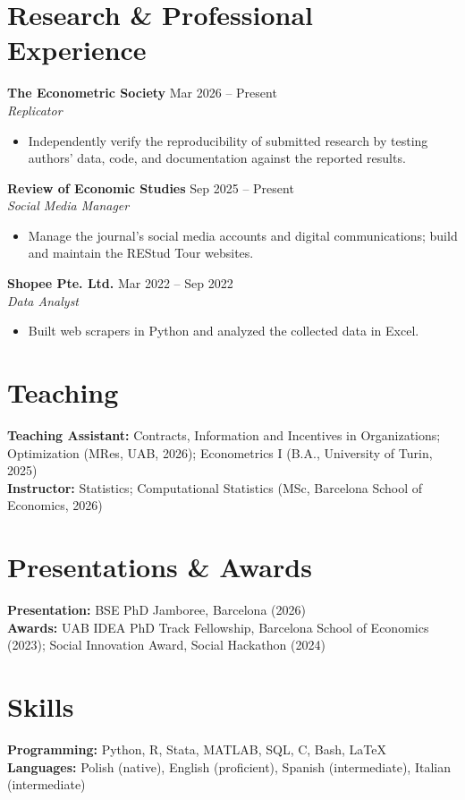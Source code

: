 \documentclass[11pt,a4paper]{article}
\newcommand{\role}[4]{%
    \textbf{#1} \hfill #2\\
    \textit{#3} \hfill \textit{#4}\par
}
\begin{document}
\section*{Research \& Professional Experience}

\role{The Econometric Society}{Mar 2026 -- Present}{Replicator}{}
\begin{itemize}
    \item Independently verify the reproducibility of submitted research by testing authors' data, code, and documentation against the reported results.
\end{itemize}
\vspace{0.3em}
\role{Review of Economic Studies}{Sep 2025 -- Present}{Social Media Manager}{}
\begin{itemize}
    \item Manage the journal's social media accounts and digital communications; build and maintain the REStud Tour websites.
\end{itemize}
\vspace{0.3em}
\role{Shopee Pte. Ltd.}{Mar 2022 -- Sep 2022}{Data Analyst}{}
\begin{itemize}
    \item Built web scrapers in Python and analyzed the collected data in Excel.
\end{itemize}

\section*{Teaching}

\textbf{Teaching Assistant:} Contracts, Information and Incentives in Organizations; Optimization (MRes, UAB, 2026); Econometrics I (B.A., University of Turin, 2025)\\
\textbf{Instructor:} Statistics; Computational Statistics (MSc, Barcelona School of Economics, 2026)

\section*{Presentations \& Awards}

\textbf{Presentation:} BSE PhD Jamboree, Barcelona (2026)\\
\textbf{Awards:} UAB IDEA PhD Track Fellowship, Barcelona School of Economics (2023); Social Innovation Award, Social Hackathon (2024)

\section*{Skills}

\textbf{Programming:} Python, R, Stata, MATLAB, SQL, C, Bash, \LaTeX\\
\textbf{Languages:} Polish (native), English (proficient), Spanish (intermediate), Italian (intermediate)
\end{document}
